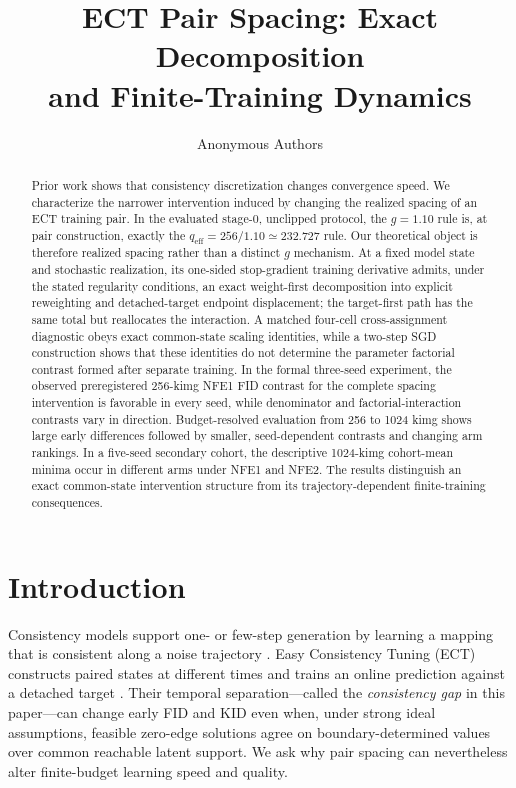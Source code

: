 \documentclass{article}
\title{ECT Pair Spacing: Exact Decomposition\\and Finite-Training Dynamics}
\author{Anonymous Authors}
\newif\ifshowcomments
\newcommand{\todo}[1]{%
  \ifshowcomments{\color{todored}\textbf{[TODO: #1]}}\fi}
\begin{document}
\maketitle

\begin{abstract}
Prior work shows that consistency discretization changes convergence speed.
We characterize the narrower intervention induced by changing the realized
spacing of an ECT training pair. In the evaluated stage-0, unclipped protocol,
the $g=1.10$ rule is, at pair construction, exactly the
$q_{\mathrm{eff}}=256/1.10\simeq232.727$ rule. Our theoretical object is
therefore realized spacing rather than a distinct $g$ mechanism. At a
fixed model state and stochastic realization, its one-sided stop-gradient
training derivative admits, under the stated regularity conditions, an exact
weight-first decomposition into explicit reweighting and detached-target
endpoint displacement; the target-first path has the same total but reallocates
the interaction. A matched four-cell cross-assignment diagnostic
obeys exact common-state scaling identities, while a two-step SGD construction
shows that these identities do not determine the parameter factorial contrast
formed after separate training. In the formal three-seed experiment, the
observed preregistered 256-kimg NFE1 FID contrast for the complete spacing
intervention is favorable in every seed, while denominator and
factorial-interaction contrasts vary in direction. Budget-resolved evaluation
from 256 to 1024 kimg shows large early differences followed by smaller,
seed-dependent contrasts and changing arm rankings. In a five-seed secondary
cohort, the descriptive 1024-kimg
cohort-mean minima occur in different arms under NFE1 and NFE2. The results
distinguish an exact common-state intervention structure from its
trajectory-dependent finite-training consequences.
\end{abstract}

\todo{Abstract: re-check wording after the prospectively unseen cohort is
complete; do not replace the current evidence status before unblinding.}

\section{Introduction}
\label{sec:introduction}

Consistency models support one- or few-step generation by learning a mapping
that is consistent along a noise trajectory \citep{song2023consistency}.
Easy Consistency Tuning (ECT) constructs paired states at different times and
trains an online prediction against a detached target
\citep{geng2024consistency}. Their temporal separation---called the
\emph{consistency gap} in this paper---can change early FID and KID even when,
under strong ideal assumptions,
feasible zero-edge solutions agree on boundary-determined values over common
reachable latent support. We ask why pair spacing can nevertheless alter
finite-budget learning speed and quality.
\end{document}
